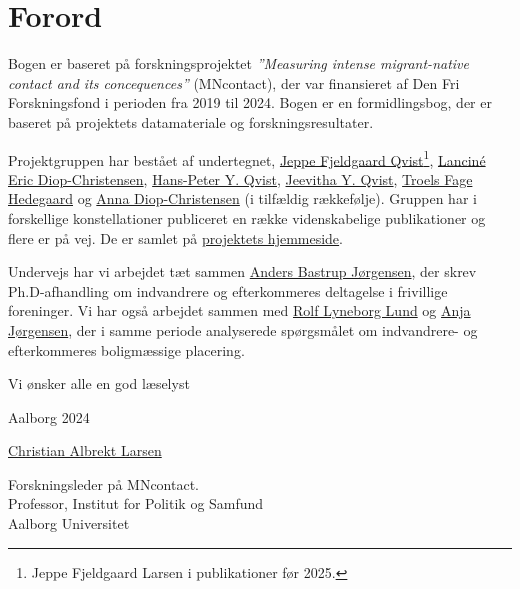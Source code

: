 \documentclass[
]{book}
\begin{document}
\newpage
\newpage
\thispagestyle{empty}


\chapter*{Forord}\label{forord}

Bogen er baseret på forskningsprojektet \emph{''Measuring intense migrant-native contact and its concequences''} (MNcontact), der var finansieret af Den Fri Forskningsfond i perioden fra 2019 til 2024. Bogen er en formidlingsbog, der er baseret på projektets datamateriale og forskningsresultater.

Projektgruppen har bestået af undertegnet, \href{https://vbn.aau.dk/da/persons/jeppefl}{Jeppe Fjeldgaard Qvist}\footnote{Jeppe Fjeldgaard Larsen i publikationer før 2025.}, \href{https://vbn.aau.dk/en/persons/led}{Lanciné Eric Diop-Christensen}, \href{https://vbn.aau.dk/da/persons/hpq}{Hans-Peter Y. Qvist}, \href{https://vbn.aau.dk/en/persons/jy}{Jeevitha Y. Qvist}, \href{https://vbn.aau.dk/en/persons/troelsfh}{Troels Fage Hedegaard} og \href{https://dk.linkedin.com/in/anna-diop-christensen-58b5ba282}{Anna Diop-Christensen} (i tilfældig rækkefølje). Gruppen har i forskellige konstellationer publiceret en række videnskabelige publikationer og flere er på vej. De er samlet på \href{https://vbn.aau.dk/en/projects/measuring-intense-migrant-native-contact-and-its-consequences/publications/}{projektets hjemmeside}.

Undervejs har vi arbejdet tæt sammen \href{https://vbn.aau.dk/en/persons/anbajo}{Anders Bastrup Jørgensen}, der skrev Ph.D-afhandling om indvandrere og efterkommeres deltagelse i frivillige foreninger. Vi har også arbejdet sammen med \href{https://vbn.aau.dk/en/persons/rolfll}{Rolf Lyneborg Lund} og \href{https://vbn.aau.dk/en/persons/anjaj}{Anja Jørgensen}, der i samme periode analyserede spørgsmålet om indvandrere- og efterkommeres boligmæssige placering.

Vi ønsker alle en god læselyst

Aalborg 2024

\href{https://vbn.aau.dk/en/persons/albrekt}{Christian Albrekt Larsen}

Forskningsleder på MNcontact.\\
Professor, Institut for Politik og Samfund\\
Aalborg Universitet\\
\end{document}
